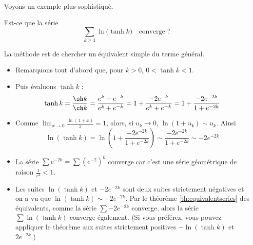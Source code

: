 \documentclass[class=report,crop=false]{standalone}
\begin{document}
Voyons un exemple plus sophistiqué.
\begin{exemple}
Est-ce que la série 
$$\sum_{k \ge 1}  \ln \big(\tanh k\big) \quad \text{converge ?}$$

La méthode est de chercher un équivalent simple du terme général.

\begin{itemize}
  \item Remarquons tout d'abord que, pour $k >0$, $0<\tanh k<1$.
  
  \item Puis évaluons $\tanh k$ :
  $$\tanh k = \frac{\sh k}{\ch k} = \frac{e^k-e^{-k}}{e^k+e^{-k}}
  = 1+  \frac{-2e^{-k}}{e^k+e^{-k}} = 1+\frac{-2e^{-2k}}{1+e^{-2k}}$$

  
  \item Comme $\lim_{x\to 0} \frac{\ln(1+x)}{x}=1$, alors, si
  $u_k \to 0$, $\ln(1+u_k) \sim u_k$. Ainsi 
  $$\ln(\tanh k) = \ln\left( 1+\frac{-2e^{-2k}}{1+e^{-2k}} \right)
  \sim  \frac{-2e^{-2k}}{1+e^{-2k}} \sim -2e^{-2k}$$
  
  
  \item La série $\sum e^{-2k}= \sum (e^{-2})^k$ converge car c'est une série géométrique de raison
  $\frac{1}{e^2} < 1$.
  
  \item Les suites $\ln(\tanh k)$ et $-2e^{-2k}$ sont deux suites strictement négatives et on a vu que 
  $\ln(\tanh k) \sim -2e^{-2k}$. Par le théorème \ref{th:equivalentseries} des équivalents, comme la série
  $\sum -2e^{-2k}$ converge, alors la série $\sum\ln(\tanh k)$ converge également. (Si vous préférez, vous pouvez 
  appliquer le théorème aux suites strictement positives $-\ln(\tanh k)$ et $2e^{-2k}$.)
 
\end{itemize}

\end{exemple}



\end{document}
